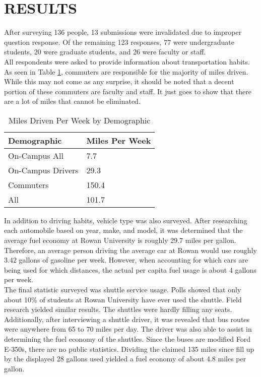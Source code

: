 \documentclass[man]{apa7}
\begin{document}
	\section{RESULTS}
	After surveying 136 people, 13 submissions were invalidated due to improper question response. Of the remaining 123 responses, 77 were undergraduate students, 20 were graduate students, and 26 were faculty or staff. 
	\\
	All respondents were asked to provide information about transportation habits. As seen in Table \ref{tbl:MilesPerWeek}, commuters are responsible for the majority of miles driven. While this may not come as any surprise, it should be noted that a decent portion of these commuters are faculty and staff. It just goes to show that there are a lot of miles that cannot be eliminated.
	\\
	\begin{table}[b]
		\afterpage{\clearpage}
		\caption{Miles Driven Per Week by Demographic}
		\begin{tabular}{|l|l|}
			\hline
			\textbf{Demographic} & \textbf{Miles Per Week} \\ \hline
			On-Campus All        & 7.7                     \\ \hline
			On-Campus Drivers    & 29.3                    \\ \hline
			Commuters            & 150.4                   \\ \hline
			All					 & 101.7				   \\ \hline
		\end{tabular}
		\label{tbl:MilesPerWeek}
	\end{table}
	In addition to driving habits, vehicle type was also surveyed. After researching each automobile based on year, make, and model, it was determined that the average fuel economy at Rowan University is roughly 29.7 miles per gallon. Therefore, an average person driving the average car at Rowan would use roughly 3.42 gallons of gasoline per week. However, when accounting for which cars are being used for which distances, the actual per capita fuel usage is about 4 gallons per week.
	\\
	The final statistic surveyed was shuttle service usage. Polls showed that only about 10\% of students at Rowan University have ever used the shuttle. Field research yielded similar results. The shuttles were hardly filling any seats. Additionally, after interviewing a shuttle driver, it was revealed that bus routes were anywhere from 65 to 70 miles per day. The driver was also able to assist in determining the fuel economy of the shuttles. Since the buses are modified Ford E-350s, there are no public statistics. Dividing the claimed 135 miles since fill up by the displayed 28 gallons used yielded a fuel economy of about 4.8 miles per gallon.
\end{document}
